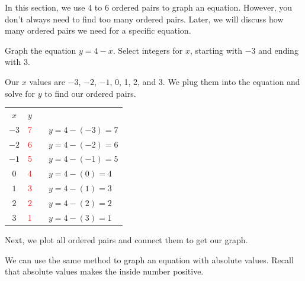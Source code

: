 \begin{nt}
    In this section, we use 4 to 6 ordered pairs to graph an equation. However, you don't always need to find too many ordered pairs. Later, we will discuss how many ordered pairs we need for a specific equation.
\end{nt}
\begin{exa}
	Graph the equation $y=4-x$. Select integers for $x$, starting with $-3$ and ending with $3$.
\end{exa}
Our $x$ values are $-3$, $-2$, $-1$, 0, 1, 2, and 3. We plug them into the equation and solve for $y$ to find our ordered pairs.
\begin{center}
\begin{tabular}{ c | c  cl}
    $x$ & $y$ &\\
    \cline{1-2}
    $-3$	& \textcolor{red}{7}    & &$y=4-(-3)=7$ \\
    $-2$	& \textcolor{red}{6}    & &$y=4-(-2)=6$ \\
    $-1$	& \textcolor{red}{5}    & &$y=4-(-1)=5$ \\
    $0$	    & \textcolor{red}{4}    & &$y=4-(0)=4$ \\
    $1$	    & \textcolor{red}{3}    & &$y=4-(1)=3$ \\
    $2$	    & \textcolor{red}{2}    & &$y=4-(2)=2$ \\
    $3$	    & \textcolor{red}{1}    & &$y=4-(3)=1$ 
\end{tabular}
\end{center}
Next, we plot all ordered pairs and connect them to get our graph.
\begin{center}
\end{center}
\begin{nt}
We can use the same method to graph an equation with absolute values. Recall that absolute values makes the inside number positive.
\end{nt}

